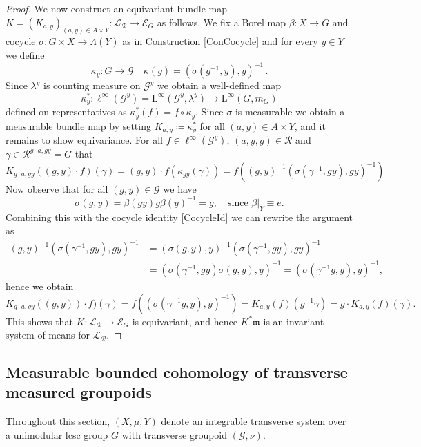 \documentclass[11pt, oneside]{amsart}
\theoremstyle{definition}
\theoremstyle{remark}
\theoremstyle{TheoremNum}
\renewcommand{\L}{\mathfrak}
\newcommand{\cE}{\mathcal E}
\newcommand{\Linf}{\mathrm{L}^{\infty}}
\newcommand{\cG}{\mathcal{G}}
\newcommand{\cR}{\mathcal{R}}
\newcommand{\cL}{\mathcal L}
\begin{document}
\begin{proof}
We now construct an equivariant bundle map $K = (K_{a,y})_{(a,y) \in A \times Y}: \cL_{\cR} \to \cE_G$ as follows.  We fix a Borel map $\beta: X \to G$ and cocycle $\sigma: G\times X\to \Lambda(Y)$ as in Construction \ref{ConCocycle} and for every $y\in Y$ we define
\[\kappa_y: G\to \mathcal{G}\quad \kappa(g)=(\sigma(g^{-1},y),y)^{-1}\,.\] 
Since $\lambda^y$ is counting measure on $\cG^y$ we obtain a well-defined map
$$\kappa_y^*: \ell^\infty(\cG^y) = \Linf(\mathcal{G}^y,\lambda^y)\to \Linf(G,m_G)$$
 defined on representatives as $ \kappa_y^*(f)=f\circ \kappa_y$. Since $\sigma$ is measurable we obtain a measurable bundle map by setting $K_{a,y} \coloneqq \kappa_y^*$ for all $(a,y) \in A \times Y$, and it remains to show equivariance. 
 For all $f \in \ell^\infty(\cG^y)$, $(a,y,g) \in \cR$ and $\gamma \in \cR^{g \cdot a, gy} = G$ that
 \[
  K_{g\cdot a,gy}((g,y)\cdot f)(\gamma)  = (g,y) \cdot f(\kappa_{gy}(\gamma)) =  f((g,y)^{-1}(\sigma(\gamma^{-1},g y),gy)^{-1})
 \]
 Now observe that for all $(g,y) \in \cG$ we have
 \[
  \sigma(g,y)=\beta(gy)g\beta(y)^{-1} = g, \quad \text{since }\beta|_Y \equiv e.
 \]
 Combining this with the cocycle identity \eqref{CocycleId} we can rewrite the argument as
\begin{align*}
(g,y)^{-1}(\sigma(\gamma^{-1},g y),gy)^{-1} &= (\sigma(g,y), y)^{-1}(\sigma(\gamma^{-1},g y),gy)^{-1}\\
&= (\sigma(\gamma^{-1},g y)\sigma(g,y),y)^{-1} = (\sigma(\gamma^{-1}g,y),y)^{-1},
\end{align*}
hence we obtain
\[
K_{g\cdot a,gy}((g,y))\cdot f)(\gamma) = f((\sigma(\gamma^{-1}g,y),y)^{-1})= K_{a,y}(f) (g^{-1} \gamma ) = g \cdot K_{a,y} (f) (\gamma).
\]
This shows that $K:  \cL_{\cR} \to \cE_G$ is equivariant, and hence $K^*\L m$ is an invariant system of means for $\cL_{\cR}$.
 \end{proof}

\subsection{Measurable bounded cohomology of transverse measured groupoids}\label{SubsecAmenable}
Throughout this section, $(X, \mu, Y)$ denote an integrable transverse system over a unimodular lcsc group $G$ with transverse groupoid $(\cG, \nu)$.
\end{document}
